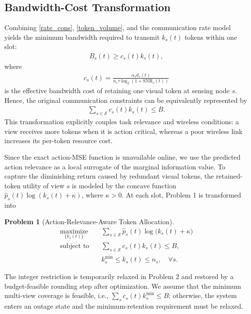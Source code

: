 \documentclass[lettersize,journal]{IEEEtran}
\theoremstyle{custom}
\newtheorem{Prob}{Problem}
\begin{document}
\subsection{Bandwidth-Cost Transformation}
Combining \eqref{rate_cons}, \eqref{token_volume}, and the communication rate model yields the minimum bandwidth required to transmit $k_s(t)$ tokens within one slot:
\begin{align}
    B_s(t) \geq c_s(t)k_s(t),
    \label{bandwidth_per_token}
\end{align}
where
\begin{align}
    c_s(t)
    = \frac{\alpha_s d_s(t)}
    {n_s\tau\log_2(1+\mathrm{SNR}_s(t))}
    \label{token_bandwidth_cost}
\end{align}
is the effective bandwidth cost of retaining one visual token at sensing node $s$. Hence, the original communication constraints can be equivalently represented by
\begin{align}
    \sum_{s\in\mathcal{S}}c_s(t)k_s(t) \leq B.
    \label{weighted_token_budget}
\end{align}
This transformation explicitly couples task relevance and wireless conditions: a view receives more tokens when it is action critical, whereas a poor wireless link increases its per-token resource cost.

Since the exact action-MSE function is unavailable online, we use the predicted action relevance as a local surrogate of the marginal information value. To capture the diminishing return caused by redundant visual tokens, the retained-token utility of view $s$ is modeled by the concave function $\widehat p_s(t)\log(k_s(t)+\kappa)$, where $\kappa>0$. At each slot, Problem 1 is transformed into
\begin{Prob}[Action-Relevance-Aware Token Allocation]
\begin{align}
    \underset{\{k_s(t)\}}{\textrm{maximize}} \quad
    & \sum_{s\in\mathcal{S}}\widehat p_s(t)
    \log\big(k_s(t)+\kappa\big) \label{surrogate_obj}\\
    \textrm{subject to} \quad
    & \sum_{s\in\mathcal{S}}c_s(t)k_s(t)\leq B, \nonumber\\
    & k_s^{\min}\leq k_s(t)\leq n_s, \quad \forall s. \nonumber
\end{align}
\label{prob_surrogate}
\end{Prob}
The integer restriction is temporarily relaxed in Problem 2 and restored by a budget-feasible rounding step after optimization. We assume that the minimum multi-view coverage is feasible, i.e., $\sum_s c_s(t)k_s^{\min}\leq B$; otherwise, the system enters an outage state and the minimum-retention requirement must be relaxed.
\end{document}
